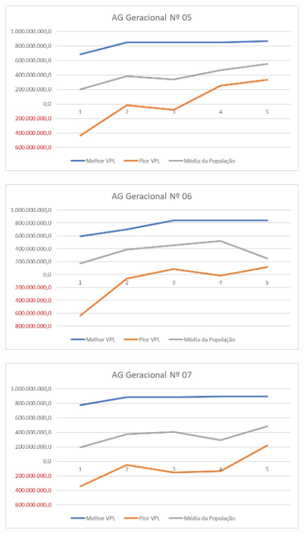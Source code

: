 \documentclass[12pt,a4paper]{report}
\begin{document}
\begin{figure}[H]
\centering

\includegraphics[scale=1]{ApC/AGG/5}

\end{figure}

\begin{figure}[H]
\centering

\includegraphics[scale=1]{ApC/AGG/6}

\end{figure}

\begin{figure}[H]
\centering

\includegraphics[scale=1]{ApC/AGG/7}

\end{figure}
\end{document}
